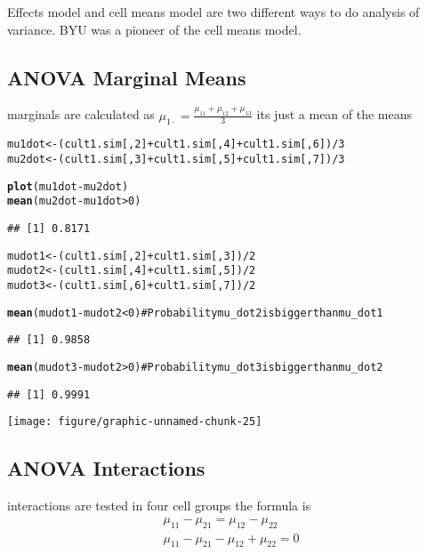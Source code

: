 \documentclass[12pt,letterpaper,oneside]{article}\usepackage{graphicx, color}
\makeatletter
\newcommand{\hlfunctioncall}[1]{\textcolor[rgb]{0.501960784313725,0,0.329411764705882}{\textbf{#1}}}%
\newcommand{\hlcomment}[1]{\textcolor[rgb]{0.180392156862745,0.6,0.341176470588235}{#1}}%
\newenvironment{kframe}{%
 \def\at@end@of@kframe{}%
 \ifinner\ifhmode%
  \def\at@end@of@kframe{\end{minipage}}%
  \begin{minipage}{\columnwidth}%
 \fi\fi%
 \def\FrameCommand##1{\hskip\@totalleftmargin \hskip-\fboxsep
 \colorbox{shadecolor}{##1}\hskip-\fboxsep
     \hskip-\linewidth \hskip-\@totalleftmargin \hskip\columnwidth}%
 \MakeFramed {\advance\hsize-\width
   \@totalleftmargin\z@ \linewidth\hsize
   \@setminipage}}%
 {\par\unskip\endMakeFramed%
 \at@end@of@kframe}
\newenvironment{knitrout}{}{} %
\makeatother
\begin{document}
Effects model and cell means model are two different ways to do analysis of variance. BYU was a pioneer of the cell means model.

\subsection{ANOVA Marginal Means} %
\label{sub:anova_marginal_means}

marginals are calculated as $\mu_{1\cdot} = \frac{\mu_{11} + \mu_{12} + \mu_{13}}{3}$
its just a mean of the means
\begin{knitrout}\scriptsize
{}\color{fgcolor}\begin{kframe}
\begin{alltt}
mu1dot <- (cult1.sim[, 2] + cult1.sim[, 4] + cult1.sim[, 6])/3
mu2dot <- (cult1.sim[, 3] + cult1.sim[, 5] + cult1.sim[, 7])/3

\hlfunctioncall{plot}(mu1dot - mu2dot)
\hlfunctioncall{mean}(mu2dot - mu1dot > 0)
\end{alltt}
\begin{verbatim}
## [1] 0.8171
\end{verbatim}
\begin{alltt}

mudot1 <- (cult1.sim[, 2] + cult1.sim[, 3])/2
mudot2 <- (cult1.sim[, 4] + cult1.sim[, 5])/2
mudot3 <- (cult1.sim[, 6] + cult1.sim[, 7])/2

\hlfunctioncall{mean}(mudot1 - mudot2 < 0)  \hlcomment{# Probability mu_dot2 is bigger than mu_dot1}
\end{alltt}
\begin{verbatim}
## [1] 0.9858
\end{verbatim}
\begin{alltt}
\hlfunctioncall{mean}(mudot3 - mudot2 > 0)  \hlcomment{# Probability mu_dot3 is bigger than mu_dot2}
\end{alltt}
\begin{verbatim}
## [1] 0.9991
\end{verbatim}
\end{kframe}

{\centering \texttt{[image: figure/graphic-unnamed-chunk-25]} 

}



\end{knitrout}

\subsection{ANOVA Interactions} %
\label{sub:anova_interactions}
interactions are tested in four cell groups the formula is
\begin{align*}
    \mu_{11}-\mu_{21} = \mu_{12}-\mu_{22}\\
    \mu_{11}-\mu_{21} - \mu_{12}+\mu_{22} = 0
\end{align*}
\end{document}
